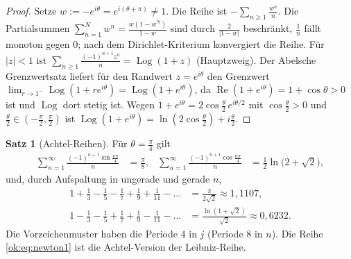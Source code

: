 \documentclass[a4paper,12pt,twoside]{report}
\theoremstyle{definition}
\newtheorem{satz}{Satz}
\begin{document}
\begin{proof}
Setze $w:=-e^{i\theta}=e^{i(\theta+\pi)}\ne1$. Die Reihe ist $-\sum_{n\ge1}\frac{w^n}n$. Die Partialsummen $\sum_{n=1}^Nw^n=\frac{w(1-w^N)}{1-w}$ sind durch $\frac2{|1-w|}$ beschränkt, $\frac1n$ fällt monoton gegen $0$; nach dem Dirichlet-Kriterium \cite{rudin_analysis} konvergiert die Reihe. Für $|z|<1$ ist $\sum_{n\ge1}\frac{(-1)^{n+1}z^n}n=\operatorname{Log}(1+z)$ (Hauptzweig). Der Abelsche Grenzwertsatz \cite{apostol_calculus} liefert für den Randwert $z=e^{i\theta}$ den Grenzwert $\lim_{r\to1^-}\operatorname{Log}(1+re^{i\theta})=\operatorname{Log}(1+e^{i\theta})$, da $\operatorname{Re}(1+e^{i\theta})=1+\cos\theta>0$ ist und $\operatorname{Log}$ dort stetig ist. Wegen $1+e^{i\theta}=2\cos\frac\theta2\,e^{i\theta/2}$ mit $\cos\frac\theta2>0$ und $\frac\theta2\in(-\frac\pi2,\frac\pi2)$ ist $\operatorname{Log}(1+e^{i\theta})=\ln(2\cos\frac\theta2)+i\frac\theta2$.
\end{proof}

\begin{satz}[Achtel-Reihen]\label{ok:satz:achtelreihe}
Für $\theta=\frac\pi4$ gilt
\begin{align}
\sum_{n=1}^\infty\frac{(-1)^{n+1}\sin\frac{n\pi}4}n&=\frac\pi8,&
\sum_{n=1}^\infty\frac{(-1)^{n+1}\cos\frac{n\pi}4}n&=\tfrac12\ln\bigl(2+\sqrt2\bigr),\label{ok:eq:achtel}
\end{align}
und, durch Aufspaltung in ungerade und gerade $n$,
\begin{align}
1+\frac13-\frac15-\frac17+\frac19+\frac1{11}-\dots&=\frac{\pi}{2\sqrt2}\approx1{,}1107,\label{ok:eq:newton1}\\
1-\frac13-\frac15+\frac17+\frac19-\frac1{11}-\dots&=\frac{\ln(1+\sqrt2)}{\sqrt2}\approx0{,}6232 .\label{ok:eq:newton2}
\end{align}
Die Vorzeichenmuster haben die Periode $4$ in $j$ (Periode 8 in $n$). Die Reihe \eqref{ok:eq:newton1} ist die Achtel-Version der Leibniz-Reihe.
\end{satz}
\end{document}
